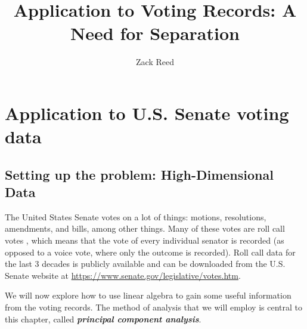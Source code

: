 \documentclass{ximera}
\author{Zack Reed}
\title{Application to Voting Records: A Need for Separation}
\begin{document}
\begin{abstract}

\end{abstract}
\maketitle


\section*{Application to U.S. Senate voting data}

\subsection*{Setting up the problem: High-Dimensional Data}
The United States Senate%
%
%
 votes on a lot of things: motions,
resolutions, amendments, and bills, among other things. Many of these
votes are roll call votes%
%
, which means that the vote of every individual
senator is recorded (as opposed to a voice vote, where only the
outcome is recorded). Roll call data for the last 3 decades is
publicly available and can be downloaded from the U.S. Senate website
at \url{https://www.senate.gov/legislative/votes.htm}.

We will now explore how to use linear algebra to gain some useful information from the
voting records. The method of analysis that we will employ is central to this chapter, called {\bf \emph{principal component analysis}}.
\end{document}
